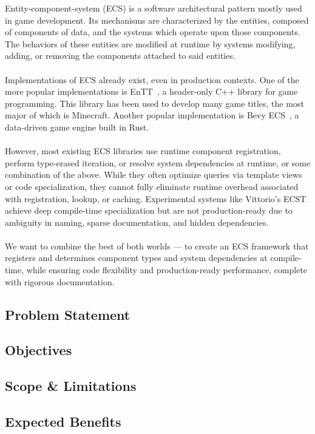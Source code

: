 Entity-component-system (ECS) is a software architectural pattern mostly used in game development.
Its mechanisms are characterized by the entities, composed of components of data,
and the systems which operate upon those components.
The behaviors of these entities are modified at runtime by systems modifying, adding, or removing the components
attached to said entities.
\\\\
Implementations of ECS already exist, even in production contexts.
One of the more popular implementations is EnTT~\cite{ValtoLibraries_EnTT}, a header-only C++ library for game programming.
This library has been used to develop many game titles, the most major of which is Minecraft.
Another popular implementation is Bevy ECS~\cite{Bevy_Engine}, a data-driven game engine built in Rust.
\\\\
However, most existing ECS libraries use runtime component registration, perform type-erased iteration, or resolve
system dependencies at runtime, or some combination of the above.
While they often optimize queries via template views or code specialization, they cannot fully eliminate
runtime overhead associated with registration, lookup, or caching.
Experimental systems like Vittorio's ECST~\cite{vittorio} achieve deep compile-time specialization
but are not production-ready due to ambiguity in naming, sparse documentation, and hidden dependencies.
\\\\
We want to combine the best of both worlds — to create an ECS framework that registers and determines component types
and system dependencies at compile-time, while ensuring code flexibility and production-ready performance, complete
with rigorous documentation.

\subsection{Problem Statement}
\label{subsec:problem-statement}

\subsection{Objectives}
\label{subsec:objectives}

\subsection{Scope \& Limitations}
\label{subsec:scope-and-limitation}

\subsection{Expected Benefits}
\label{subsec:expected-benefits}